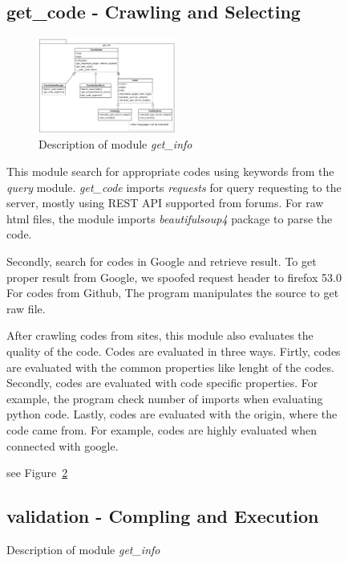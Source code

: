\documentclass[conference]{IEEEtran}
\begin{document}
\begin{itemize}
\begin{itemize}
\begin{itemize}
\begin{itemize}
\begin{figure}[h]
\begin{enumerate}
\begin{itemize}
\begin{enumerate}
\subsection{get\_code - Crawling and Selecting} %
\label{sub:get_code}
\begin{figure}[ht]
\centering
\includegraphics[width=0.5\textwidth]{./figures/get_info.png}
\caption{Description of module \textit{get\_info}}
\label{get_info}
\end{figure}

This module search for appropriate codes using keywords from the \textit{query} module.
\textit{get\_code} imports \textit{requests} for query requesting to the server, mostly using REST API supported from forums.
For raw html files, the module imports \textit{beautifulsoup4} package to parse the code.

Secondly, search for codes in Google and retrieve result.
To get proper result from Google, we spoofed request header to firefox 53.0
For codes from Github, The program manipulates the source to get raw file.

After crawling codes from sites, this module also evaluates the quality of the code.
Codes are evaluated in three ways.
Firtly, codes are evaluated with the common properties like lenght of the codes.
Secondly, codes are evaluated with code specific properties. 
For example, the program check number of imports when evaluating python code.
Lastly, codes are evaluated with the origin, where the code came from.
For example, codes are highly evaluated when connected with google.

see Figure~\ref{get_info}

\subsection{validation - Compling and Execution} %
\label{sub:validation}


\end{enumerate}
\end{itemize}
\end{enumerate}
\end{figure}
\end{itemize}
\end{itemize}
\end{itemize}
\end{itemize}
\end{document}
